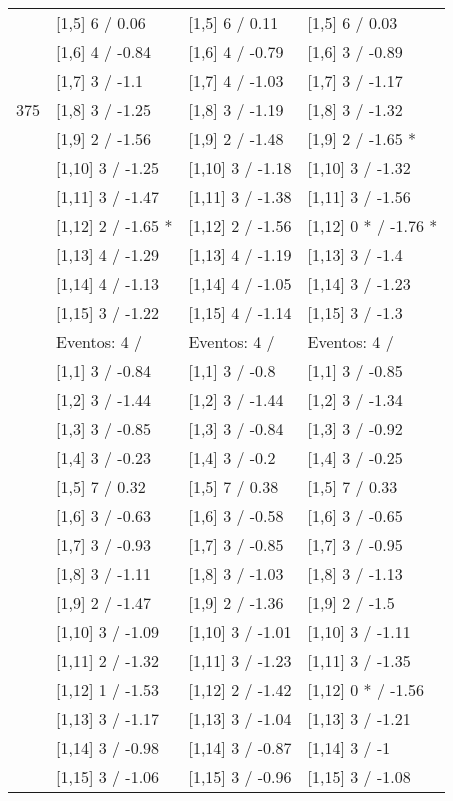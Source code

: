 \begin{table}
\begin{tabular}[t]{llll}
 & {}[1,5] 6  / 0.06 & {}[1,5] 6  / 0.11 & {}[1,5] 6  / 0.03\\
 & {}[1,6] 4  / -0.84 & {}[1,6] 4  / -0.79 & {}[1,6] 3  / -0.89\\
 & {}[1,7] 3  / -1.1 & {}[1,7] 4  / -1.03 & {}[1,7] 3  / -1.17\\
375 & {}[1,8] 3  / -1.25 & {}[1,8] 3  / -1.19 & {}[1,8] 3  / -1.32\\
\addlinespace
 & {}[1,9] 2  / -1.56 & {}[1,9] 2  / -1.48 & {}[1,9] 2  / -1.65 *\\
 & {}[1,10] 3  / -1.25 & {}[1,10] 3  / -1.18 & {}[1,10] 3  / -1.32\\
 & {}[1,11] 3  / -1.47 & {}[1,11] 3  / -1.38 & {}[1,11] 3  / -1.56\\
 & {}[1,12] 2  / -1.65 * & {}[1,12] 2  / -1.56 & {}[1,12] 0 * / -1.76 *\\
 & {}[1,13] 4  / -1.29 & {}[1,13] 4  / -1.19 & {}[1,13] 3  / -1.4\\
\addlinespace
 & {}[1,14] 4  / -1.13 & {}[1,14] 4  / -1.05 & {}[1,14] 3  / -1.23\\
 & {}[1,15] 3  / -1.22 & {}[1,15] 4  / -1.14 & {}[1,15] 3  / -1.3\\
 & Eventos:  4 / & Eventos:  4 / & Eventos:  4 /\\
 & {}[1,1] 3  / -0.84 & {}[1,1] 3  / -0.8 & {}[1,1] 3  / -0.85\\
 & {}[1,2] 3  / -1.44 & {}[1,2] 3  / -1.44 & {}[1,2] 3  / -1.34\\
\addlinespace
 & {}[1,3] 3  / -0.85 & {}[1,3] 3  / -0.84 & {}[1,3] 3  / -0.92\\
 & {}[1,4] 3  / -0.23 & {}[1,4] 3  / -0.2 & {}[1,4] 3  / -0.25\\
 & {}[1,5] 7  / 0.32 & {}[1,5] 7  / 0.38 & {}[1,5] 7  / 0.33\\
 & {}[1,6] 3  / -0.63 & {}[1,6] 3  / -0.58 & {}[1,6] 3  / -0.65\\
 & {}[1,7] 3  / -0.93 & {}[1,7] 3  / -0.85 & {}[1,7] 3  / -0.95\\
\addlinespace
500 & {}[1,8] 3  / -1.11 & {}[1,8] 3  / -1.03 & {}[1,8] 3  / -1.13\\
 & {}[1,9] 2  / -1.47 & {}[1,9] 2  / -1.36 & {}[1,9] 2  / -1.5\\
 & {}[1,10] 3  / -1.09 & {}[1,10] 3  / -1.01 & {}[1,10] 3  / -1.11\\
 & {}[1,11] 2  / -1.32 & {}[1,11] 3  / -1.23 & {}[1,11] 3  / -1.35\\
 & {}[1,12] 1  / -1.53 & {}[1,12] 2  / -1.42 & {}[1,12] 0 * / -1.56\\
\addlinespace
 & {}[1,13] 3  / -1.17 & {}[1,13] 3  / -1.04 & {}[1,13] 3  / -1.21\\
 & {}[1,14] 3  / -0.98 & {}[1,14] 3  / -0.87 & {}[1,14] 3  / -1\\
 & {}[1,15] 3  / -1.06 & {}[1,15] 3  / -0.96 & {}[1,15] 3  / -1.08\\
\bottomrule
\end{tabular}
\end{table}
